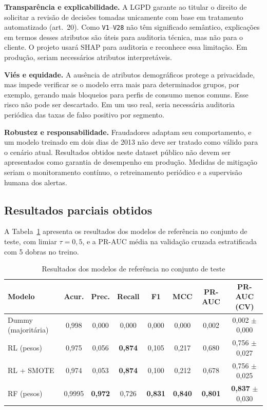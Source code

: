 \documentclass[12pt]{article}
\begin{document}
\textbf{Transparência e explicabilidade.} A LGPD garante ao titular o direito de
solicitar a revisão de decisões tomadas unicamente com base em tratamento
automatizado (art.~20). Como \texttt{V1}--\texttt{V28} não têm significado
semântico, explicações em termos desses atributos são úteis para auditoria
técnica, mas não para o cliente. O projeto usará SHAP \cite{lundberg:2017}
para auditoria e reconhece essa limitação. Em produção, seriam necessários
atributos interpretáveis.

\textbf{Viés e equidade.} A ausência de atributos demográficos protege a
privacidade, mas impede verificar se o modelo erra mais para determinados
grupos, por exemplo, gerando mais bloqueios para perfis de consumo menos comuns.
Esse risco não pode ser descartado. Em um uso real, seria necessária auditoria
periódica das taxas de falso positivo por segmento.

\textbf{Robustez e responsabilidade.} Fraudadores adaptam seu comportamento, e
um modelo treinado em dois dias de 2013 não deve ser tratado como válido para o
cenário atual. Resultados obtidos neste dataset público não devem ser
apresentados como garantia de desempenho em produção. Medidas de mitigação
seriam o monitoramento contínuo, o retreinamento periódico e a supervisão
humana dos alertas.

\subsection{Resultados parciais obtidos}

A Tabela~\ref{tab:baselines} apresenta os resultados dos modelos de referência
no conjunto de teste, com limiar $\tau = 0{,}5$, e a PR-AUC média na validação
cruzada estratificada com 5 dobras no treino.

\begin{table}[ht]
\centering
\caption{Resultados dos modelos de referência no conjunto de teste}
\label{tab:baselines}
\footnotesize
\begin{tabular}{@{}lccccccc@{}}
\toprule
\textbf{Modelo} & \textbf{Acur.} & \textbf{Prec.} & \textbf{Recall} & \textbf{F1} & \textbf{MCC} & \textbf{PR-AUC} & \textbf{PR-AUC (CV)} \\
\midrule
Dummy (majoritária) & 0,998 & 0,000 & 0,000 & 0,000 & 0,000 & 0,002 & 0,002 $\pm$ 0,000 \\
RL (pesos) & 0,975 & 0,056 & \textbf{0,874} & 0,105 & 0,217 & 0,680 & 0,756 $\pm$ 0,027 \\
RL + SMOTE & 0,974 & 0,053 & \textbf{0,874} & 0,100 & 0,212 & 0,678 & 0,756 $\pm$ 0,025 \\
RF (pesos) & 0,9995 & \textbf{0,972} & 0,726 & \textbf{0,831} & \textbf{0,840} & \textbf{0,801} & \textbf{0,837} $\pm$ 0,030 \\
\bottomrule
\end{tabular}
\end{table}
\end{document}
